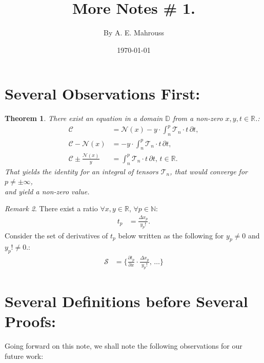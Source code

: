 \documentclass[10pt]{article}
\title{%
	\vspace{-1.5em}%
	\large\textbf{More Notes \# 1.}%
}
\author{By A. E. Mahrouss}
\date{\today}
\theoremstyle{plain}
\newtheorem{theorem}{Theorem}[section]
\theoremstyle{definition}
\theoremstyle{remark}
\newtheorem{remark}[theorem]{Remark}
\begin{document}
	
	\maketitle
	\tableofcontents
	\newpage

\section{Several Observations First:}

\begin{theorem}
There exist an equation in a domain $\mathbb{D}$ from a non-zero $x, y, t \in \mathbb{R}$.:
\begin{align*}
    \mathcal{C} &= \mathcal{N}(x) - y \cdot \int_{n}^{p} \mathcal{T}_{n} \cdot t \, \partial t,\\
    \mathcal{C} - \mathcal{N}(x) &= -y \cdot \int_{n}^{p} \mathcal{T}_{n} \cdot t \, \partial t,\\
    \mathcal{C} \pm \frac{\mathcal{N}(x)}{y} &= \int_{n}^{p} \mathcal{T}_{n} \cdot t \, \partial t, \, t \in \mathbb{R}.
\end{align*}
That yields the identity for an integral of tensors $\mathcal{T}_n$, that would converge for $p \neq \pm \infty$,\\ and yield a non-zero value.
\end{theorem}

\begin{remark}
There exist a ratio $\forall x, y \in \mathbb{R}$, $\forall p \in \mathbb{N}$:
\begin{align*}
	t_p &= \frac{\Delta x_p}{y_p!}.
\end{align*}
Consider the set of derivatives of $t_p$ below written as the following for $y_p \neq 0$ and $y_p! \neq 0$.:
\begin{align*}
	\mathcal{S} &= \{ \frac{\partial t_p}{\partial x} \cdot \frac{\Delta x_p}{y_p!}, \, \dots \}
\end{align*}
\end{remark}

\section{Several Definitions before Several Proofs:}

Going forward on this note, we shall note the following observations for our future work:
\end{document}
